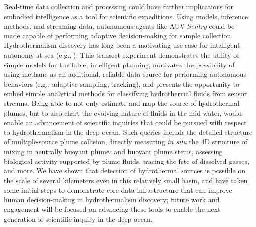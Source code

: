 Real-time data collection and processing could have further implications for embodied intelligence as a tool for scientific expeditions. Using models, inference methods, and streaming data, autonomous agents like AUV \emph{Sentry} could be made capable of performing adaptive decision-making for sample collection. Hydrothermalism discovery has long been a motivating use case for intelligent autonomy at sea (e.g., \cite{yoerger2007autonomous, jakuba2007stochastic, branch2020demonstration, wang20203}). This transect experiment demonstrates the utility of simple models for tractable, intelligent planning, motivates the possibility of using methane as an additional, reliable data source for performing autonomous behaviors (e.g., adaptive sampling, tracking), and presents the opportunity to embed simple analytical methods for classifying hydrothermal fluids from sensor streams. Being able to not only estimate and map the source of hydrothermal plumes, but to also chart the evolving nature of fluids in the mid-water, would enable an advancement of scientific inquiries that could be pursued with respect to hydrothermalism in the deep ocean. Such queries include the detailed structure of multiple-source plume collision, directly measuring \emph{in situ} the 4D structure of mixing in neutrally buoyant plumes and buoyant plume stems, assessing biological activity supported by plume fluids, tracing the fate of dissolved gasses, and more. We have shown that detection of hydrothermal sources is possible on the scale of several kilometers even in this relatively small basin, and have taken some initial steps to demonstrate core data infrastructure that can improve human decision-making in hydrothermalism discovery; future work and engagement will be focused on advancing these tools to enable the next generation of scientific inquiry in the deep ocean.

